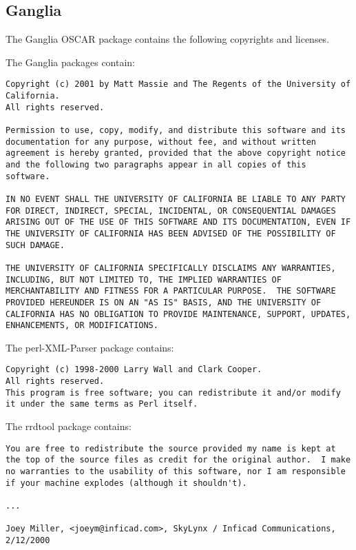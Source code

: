 %
%
%

\subsection{Ganglia}
The Ganglia OSCAR package contains the following copyrights and licenses.

The Ganglia packages contain:

\begin{verbatim}
Copyright (c) 2001 by Matt Massie and The Regents of the University of
California.
All rights reserved.

Permission to use, copy, modify, and distribute this software and its
documentation for any purpose, without fee, and without written
agreement is hereby granted, provided that the above copyright notice
and the following two paragraphs appear in all copies of this
software.

IN NO EVENT SHALL THE UNIVERSITY OF CALIFORNIA BE LIABLE TO ANY PARTY
FOR DIRECT, INDIRECT, SPECIAL, INCIDENTAL, OR CONSEQUENTIAL DAMAGES
ARISING OUT OF THE USE OF THIS SOFTWARE AND ITS DOCUMENTATION, EVEN IF
THE UNIVERSITY OF CALIFORNIA HAS BEEN ADVISED OF THE POSSIBILITY OF
SUCH DAMAGE.

THE UNIVERSITY OF CALIFORNIA SPECIFICALLY DISCLAIMS ANY WARRANTIES,
INCLUDING, BUT NOT LIMITED TO, THE IMPLIED WARRANTIES OF
MERCHANTABILITY AND FITNESS FOR A PARTICULAR PURPOSE.  THE SOFTWARE
PROVIDED HEREUNDER IS ON AN "AS IS" BASIS, AND THE UNIVERSITY OF
CALIFORNIA HAS NO OBLIGATION TO PROVIDE MAINTENANCE, SUPPORT, UPDATES,
ENHANCEMENTS, OR MODIFICATIONS.
\end{verbatim}

The perl-XML-Parser package contains:

\begin{verbatim}
Copyright (c) 1998-2000 Larry Wall and Clark Cooper.
All rights reserved.
This program is free software; you can redistribute it and/or modify
it under the same terms as Perl itself.
\end{verbatim}

The rrdtool package contains:

\begin{verbatim}
You are free to redistribute the source provided my name is kept at
the top of the source files as credit for the original author.  I make
no warranties to the usability of this software, nor I am responsible
if your machine explodes (although it shouldn't).

...

Joey Miller, <joeym@inficad.com>, SkyLynx / Inficad Communications,
2/12/2000
\end{verbatim}

